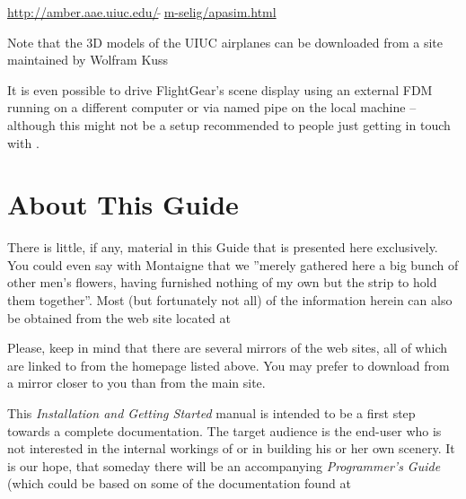 \href{http://amber.aae.uiuc.edu/~m-selig/apasim.html}{http://amber.aae.uiuc.edu/$\tilde{~~}$m-selig/apasim.html}
\medskip

\noindent
Note that the 3D models of the UIUC airplanes can be downloaded from a site maintained by Wolfram Kuss
\medskip

\medskip

It is even possible to drive FlightGear's scene display using an external
FDM running on a different computer or via named
pipe on the local machine -- although this might not be a
setup recommended to people just getting in touch with \FlightGear.


\section{About This Guide}

There is little, if any, material in this Guide that is presented here exclusively. You
could even say with Montaigne that we ''merely gathered here a big bunch of other men's
flowers, having furnished nothing of my own but the strip to hold them together''. Most
(but fortunately not all) of the information herein can also be obtained from the
\FlightGear{} web site located at
\medskip

\medskip

Please, keep in mind that there are several mirrors of the \FlightGear{} web sites, all
of which are linked to from the \FlightGear{} homepage listed above.
You may prefer to download \FlightGear{} from a mirror closer to you than from the
main site.

This \textit{\FlightGear{} Installation and Getting Started} manual is intended to be a
first step towards a complete \FlightGear{} documentation. The target
audience is the end-user who is not interested in the internal workings of 
or in building his or her own scenery. It is our hope, that someday there
will be an accompanying \textit{\FlightGear{} Programmer's Guide} (which could be based on some of the documentation found at
 \medskip

